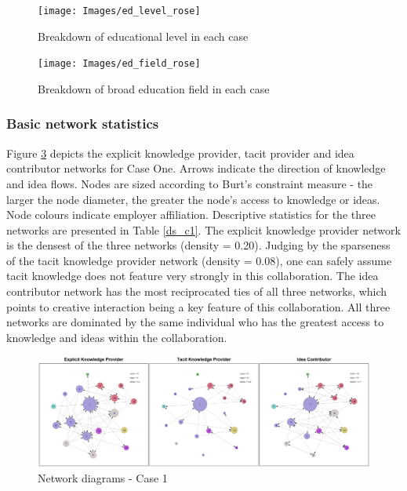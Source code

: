 \begin{figure}
\centering
\texttt{[image: Images/ed\_level\_rose]}
\caption{Breakdown of educational level in each case}
\label{fig:edlevelrose}
\end{figure}

\begin{figure}
\centering
\texttt{[image: Images/ed\_field\_rose]}
\caption{Breakdown of broad education field in each case}
\label{fig:edfieldrose}
\end{figure}

\subsubsection{Basic network statistics}

Figure \ref{fig:thesisnetworkscase1} depicts the explicit knowledge provider, tacit  provider and idea contributor networks for Case One. Arrows indicate the direction of knowledge and idea flows. Nodes are sized according to Burt's constraint measure - the larger the node diameter, the greater the node's access to knowledge or ideas. Node colours indicate employer affiliation. Descriptive statistics for the three networks are presented in Table \ref{ds_c1}. The explicit knowledge provider network is the densest of the three networks (density = 0.20). Judging by the sparseness of the tacit knowledge provider network (density = 0.08), one can safely assume tacit knowledge does not feature very strongly in this collaboration. The idea contributor network has the most reciprocated ties of all three networks, which points to creative interaction being a key feature of this collaboration. All three networks are dominated by the same individual who has the greatest access to knowledge and ideas within the collaboration.\medskip

\begin{landscape}
	\begin{figure}
		\centering
		\includegraphics[width=1.0\linewidth]{Images/thesis_networks_case1}
		\caption{Network diagrams - Case 1}
		\label{fig:thesisnetworkscase1}
	\end{figure}
\end{landscape}

